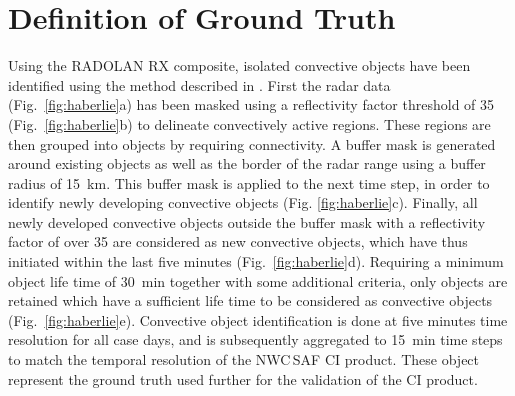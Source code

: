 \section{Definition of Ground Truth}
\label{sec:haci}
Using the RADOLAN RX composite, isolated convective objects have been identified using the method described in \citet{Haberlie_2015}. First the radar data (Fig.~\ref{fig:haberlie}a) has been masked using a reflectivity factor threshold of \SI{35}{\dbZ} (Fig.~\ref{fig:haberlie}b) to delineate convectively active regions. These regions are then grouped into objects by requiring connectivity. A buffer mask is generated around existing objects as well as the border of the radar range using a buffer radius of \SI{15}{\kilo\metre}. This buffer mask is applied to the next time step, in order to identify newly developing convective objects (Fig. \ref{fig:haberlie}c). Finally, all newly developed convective objects outside the buffer mask with a reflectivity factor of over \SI{35}{\dbZ} are considered as new convective objects, which have thus initiated within the last five minutes (Fig.~\ref{fig:haberlie}d). Requiring a minimum object life time of \SI{30}{\minute} together with some additional  criteria, only objects are retained which have a sufficient life time to be considered as convective objects (Fig.~\ref{fig:haberlie}e). Convective object identification is done at five minutes time resolution for all case days, and is subsequently aggregated to \SI{15}{\minute} time steps to match the temporal resolution of the NWC\,SAF CI product. These object represent the ground truth used further for the validation of the CI product.

